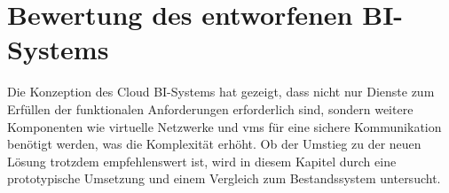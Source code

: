 \chapter{Bewertung des entworfenen BI-Systems} \label{ch:praktischeUmsetzung}
Die Konzeption des Cloud BI-Systems hat gezeigt, dass nicht nur Dienste zum Erfüllen der funktionalen Anforderungen erforderlich sind, sondern weitere Komponenten wie virtuelle Netzwerke und \acp{vm} für eine sichere Kommunikation benötigt werden, was die Komplexität erhöht. Ob der Umstieg zu der neuen Lösung trotzdem empfehlenswert ist, wird in diesem Kapitel durch eine prototypische Umsetzung und einem Vergleich zum Bestandssystem untersucht.




